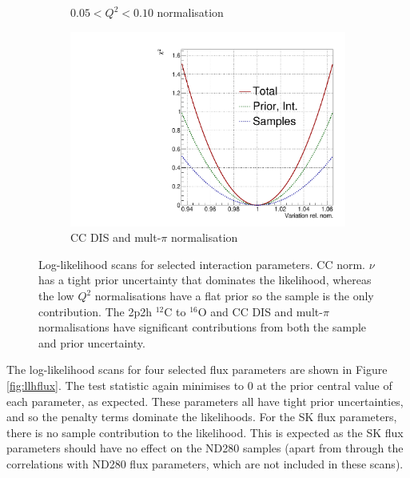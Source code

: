 \begin{figure}
\begin{subfigure}{.49\textwidth}
  \caption{$0.05 < Q^2 < 0.10$ normalisation}
\end{subfigure}
\begin{subfigure}{.49\textwidth}
  \centering
  \includegraphics[width=0.7\linewidth]{figs/llh/CC_DIS_MultPi_Norm_Nubar_llh.pdf}
  \caption{CC DIS and mult-$\pi$ normalisation}
\end{subfigure}
\caption{Log-likelihood scans for selected interaction parameters. CC norm. $\nu$ has a tight prior uncertainty that dominates the likelihood, whereas the low $Q^2$ normalisations have a flat prior so the sample is the only contribution. The 2p2h $^{12}$C to $^{16}$O and CC DIS and mult-$\pi$ normalisations have significant contributions from both the sample and prior uncertainty.}
\label{fig:llhxsec} 
\end{figure}

The log-likelihood scans for four selected flux parameters are shown in Figure \ref{fig:llhflux}. The test statistic again minimises to 0 at the prior central value of each parameter, as expected. These parameters all have tight prior uncertainties, and so the penalty terms dominate the likelihoods. For the SK flux parameters, there is no sample contribution to the likelihood. This is expected as the SK flux parameters should have no effect on the ND280 samples (apart from through the correlations with ND280 flux parameters, which are not included in these scans). 


